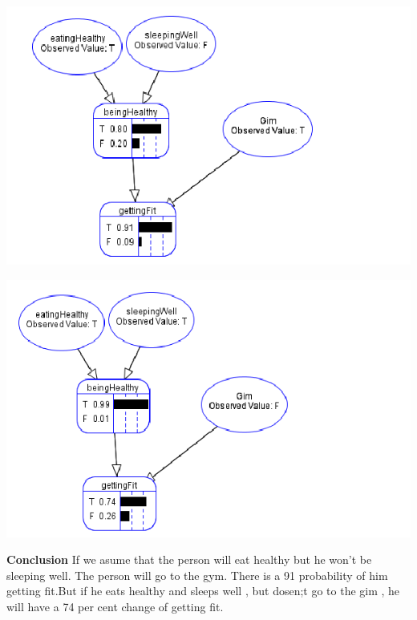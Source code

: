 \begin{itemize}
\begin{center}
  	\includegraphics[scale=0.8]{ex4}
\end{center}

\begin{center}
  	\includegraphics[scale=0.8]{ex44}
\end{center}


\tab \textbf{Conclusion} If we asume that the person will eat healthy but he won't be sleeping well. The person will go to the gym. There is a 91 probability of him getting fit.But if he eats healthy and sleeps well , but dosen;t go to the gim , he will have a 74 per cent change of getting fit.
\end{itemize}